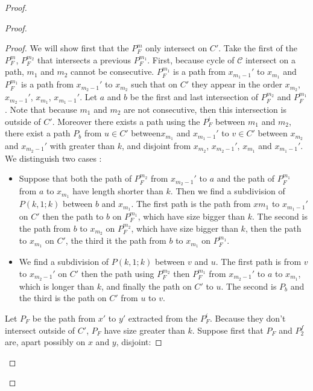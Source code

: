\documentclass[10pt]{article}
\theoremstyle{plain}
\theoremstyle{definition}
\theoremstyle{remark}
\begin{document}
\begin{proof}
\begin{proof}
\begin{proof}
We will show first that the $P_F^m$ only intersect on $C'$. Take the first of the $P_F^m$, $P_F^{m_2}$ that intersects
a previous $P_F^{m_1}$. First, because cycle of $\mathcal{C}$ intersect on a path, $m_1$ and $m_2$ cannot be consecutive.
$P_F^{m_1}$ is a path from $x_{m_1-1}'$ to $x_{m_1}$ and  $P_F^{m_1}$ is a path from $x_{m_2-1}'$ to $x_{m_2}$ such that on $C'$ they appear
in the order $x_{m_2}$, $x_{m_2-1}'$, $x_{m_1}$, $x_{m_1-1}'$.
Let $a$ and $b$ be the first and last intersection of $P_F^{m_2}$ and $P_F^{m_1}$.
Note that because $m_1$ and $m_2$ are not consecutive, then this intersection is outside of $C'$.
Moreover there exists a path using the $P_F^i$ between $m_1$ and $m_2$, there exist a path $P_b$ from $u \in C'$
between$x_{m_1}$ and $x_{m_1-1}'$ to $v \in C'$ between $x_{m_2}$ and $x_{m_2-1}'$ with greater than $k$, 
and disjoint from $x_{m_2}$, $x_{m_2-1}'$, $x_{m_1}$ and $x_{m_1-1}'$. We distinguish two cases :
\begin{itemize}
	\item Suppose that both the path of $P_F^{m_2}$ from $x_{m_2-1}'$ to $a$ and the path of $P_F^{m_1}$ from $a$ to $x_{m_1}$ have
	length shorter than $k$. Then we find a subdivision of $P(k,1;k)$ between $b$ and $x_{m_1}$. The first path is the path from 
	$x{m_1}$ to $x_{m_1-1}'$ on $C'$ then the path to $b$ on $P_F^{m_1}$, which have size bigger than $k$. 
	The second is the path from $b$ to $x_{m_2}$ on $P_F^{m_2}$, which have size bigger than $k$,
	then the path to $x_{m_1}$ on $C'$, the third it the path from $b$ to $x_{m_1}$ on $P_F^{m_1}$.
	\item We find a subdivision of $P(k,1;k)$ between $v$ and $u$. The first path is from $v$ to $x_{m_2-1}'$ on $C'$ then the 
	path using $P_F^{m_2}$ then  $P_F^{m_1}$ from  $x_{m_2-1}'$ to $a$ to $x_{m_1}$, which is longer than $k$,
	and finally the path on $C'$ to $u$. The second is $P_b$ and the third is the path on $C'$ from $u$ to $v$.
\end{itemize}


Let $P_F$ be the path from $x'$ to $y'$ extracted from the $P_F^i$. Because they don't intersect outside of $C'$,
$P_F$ have size greater than $k$.
Suppose first that $P_F$ and $P_2^f$ are, apart possibly on $x$ and $y$, disjoint:



\end{proof}
\end{proof}
\end{proof}
\end{document}
